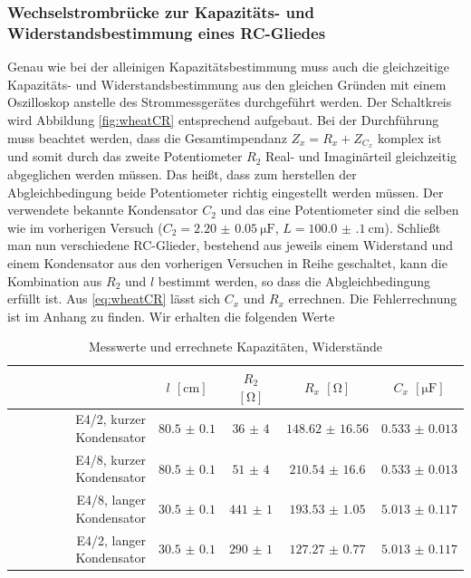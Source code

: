 \subsubsection{Wechselstrombrücke zur Kapazitäts- und Widerstandsbestimmung eines RC-Gliedes}
Genau wie bei der alleinigen Kapazitätsbestimmung muss auch die gleichzeitige Kapazitäts- und Widerstandsbestimmung aus den gleichen Gründen mit einem Oszilloskop anstelle des Strommessgerätes durchgeführt werden. Der Schaltkreis wird Abbildung \ref{fig:wheatCR} entsprechend aufgebaut. Bei der Durchführung muss beachtet werden, dass die Gesamtimpendanz $ Z_x = R_x + Z_{C_x} $ komplex ist und somit durch das zweite Potentiometer $ R_2 $ Real- und Imaginärteil gleichzeitig abgeglichen werden müssen. Das heißt, dass zum herstellen der Abgleichbedingung beide Potentiometer richtig eingestellt werden müssen. Der verwendete bekannte Kondensator $ C_2 $ und das eine Potentiometer sind die selben wie im vorherigen Versuch ($ C_2 = \SI{2.20(5)}{\micro\farad} $, $ L = \SI{100.0(1)}{\centi\meter} $). Schließt man nun verschiedene RC-Glieder, bestehend aus jeweils einem Widerstand und einem Kondensator aus den vorherigen Versuchen in Reihe geschaltet, kann die Kombination aus $ R_2 $ und $ l $ bestimmt werden, so dass die Abgleichbedingung erfüllt ist. Aus \eqref{eq:wheatCR} lässt sich $ C_x $ und $ R_x $ errechnen. Die Fehlerrechnung ist im Anhang zu finden. Wir erhalten die folgenden Werte
\begin{table}[H]
	\centering
	\begin{tabular}{r|cccc}
		& $ l $ $ [\si{\centi\meter}] $ & $ R_2 $ $ [\si{\ohm}] $ & $ R_x $ $ [\si{\ohm}] $ & $ C_x $ $ [\si{\micro\farad}] $  \\\hline
		E4/2, kurzer Kondensator & $ \num{80.5(01)} $ & $ \num{36(4)} $ & $ \num{148.62(1656)} $ & $ \num{0.533(0013)} $\\
		E4/8, kurzer Kondensator & $ \num{80.5(01)} $ & $ \num{51(4)} $ & $ \num{210.54(1660)} $ & $ \num{0.533(0013)} $\\
		E4/8, langer Kondensator & $ \num{30.5(01)} $ & $ \num{441(1)} $ & $ \num{193.53(105)} $ & $ \num{5.013(0117)} $\\
		E4/2, langer Kondensator & $ \num{30.5(01)} $ & $ \num{290(1)} $ & $ \num{127.27(077)} $ & $ \num{5.013(0117)} $\\
	\end{tabular}
	\caption{Messwerte und errechnete Kapazitäten, Widerstände}
\end{table}

